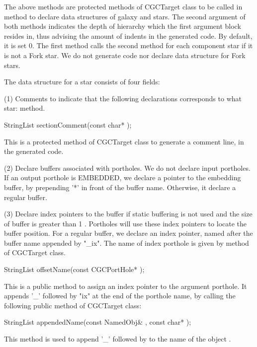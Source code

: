 {The above methods are protected methods of CGCTarget class to be called
in  method to declare data structures of galaxy and stars.
The second argument of both methods indicates the depth of hierarchy which
the first argument block resides in, thus advising the amount of indents
in the generated code. By default, it is set 0. The first method calls
the second method for each component star if it is not a Fork star. We do
not generate code nor declare data structure for Fork stars.

The data structure for a star consists of four fields:

(1) Comments to indicate that the following declarations corresponds to what
star:  method.

\begin{example}
StringList sectionComment(const char* );
\end{example}

This is a protected method of CGCTarget class to generate a comment line,
 in the generated code.

(2) Declare buffers associated with portholes. We do not declare input
portholes. If an output porthole is EMBEDDED, we declare a pointer to 
the embedding buffer, by prepending '*' in front of the buffer name. 
Otherwise, it declare a regular buffer. 

(3) Declare index pointers to the buffer if static buffering
is not used and the size of buffer is greater than 1 . Portholes
will use these index pointers to locate the buffer position. For a regular
buffer, we declare an index pointer, named after the buffer name appended by
"_ix". The name of index porthole is given by  method 
of CGCTarget class.

\begin{example}
StringList offsetName(const CGCPortHole* );
\end{example}

This is a public method to assign an index pointer to the argument porthole.
It appends '_' followed by "ix" at the end of the porthole name, by calling
the following public method of CGCTarget class:

\begin{example}
StringList appendedName(const NamedObj& , const char* );
\end{example}

This  method is used to append '_' followed by
 to the name of the object .

}
